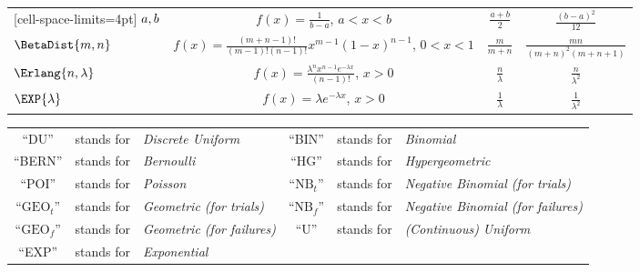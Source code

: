 \begin{table}[!htbp]
\begin{NiceTabular}{l|c|c|c}[cell-space-limits=4pt]
        \midrule
        $ \relax{a,b} $ & $ f(x)=\frac{1}{b-a} $, $ a<x<b $ & $ \frac{a+b}{2} $ & $ \frac{(b-a)^2}{12} $\\
        $ \BetaDist{m,n} $ & $ f(x)=\frac{(m+n-1)!}{(m-1)!(n-1)!}x^{m-1}(1-x)^{n-1} $, $ 0<x<1 $ & $ \frac{m}{m+n} $ & $ \frac{mn}{(m+n)^2(m+n+1)} $\\
        $ \Erlang{n,\lambda} $ & $ f(x)=\frac{\lambda^n x^{n-1}e^{-\lambda x}}{(n-1)!} $, $ x>0 $ & $ \frac{n}{\lambda} $ & $ \frac{n}{\lambda^2} $\\
        $ \EXP{\lambda} $ & $ f(x)=\lambda e^{-\lambda x} $, $ x>0 $ & $ \frac{1}{\lambda} $ & $ \frac{1}{\lambda^2} $\\
        \bottomrule
    \end{NiceTabular}
\end{table}
\begin{table}[!htbp]
    \centering
    \begin{tabular}{cclccl}
        ``DU''               & stands for & \emph{Discrete Uniform}         & ``BIN''             & stands for & \emph{Binomial}                         \\
        ``BERN''             & stands for & \emph{Bernoulli}                & ``HG''              & stands for & \emph{Hypergeometric}                   \\
        ``POI''              & stands for & \emph{Poisson}                  & ``$ \text{NB}_t $'' & stands for & \emph{Negative Binomial (for trials)}   \\
        ``$ \text{GEO}_t $'' & stands for & \emph{Geometric (for trials)}   & ``$ \text{NB}_f $'' & stands for & \emph{Negative Binomial (for failures)} \\
        ``$ \text{GEO}_f $'' & stands for & \emph{Geometric (for failures)} & ``U''               & stands for & \emph{(Continuous) Uniform}             \\
        ``EXP''              & stands for & \emph{Exponential}
    \end{tabular}
\end{table}

